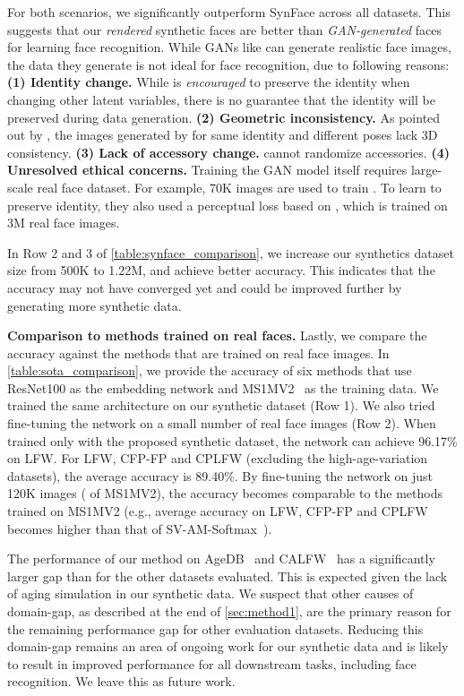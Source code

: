 \documentclass[10pt,twocolumn,letterpaper]{article}
\begin{document}
For both scenarios, we significantly outperform SynFace across all datasets.
This suggests that our \textit{rendered} synthetic faces are better than \textit{GAN-generated} faces for learning face recognition. 
While GANs like \cite{2020_discofacegan} can generate realistic face images, the data they generate is not ideal for face recognition, due to following reasons: \textbf{(1) Identity change.}
While \cite{2020_discofacegan} is \textit{encouraged} to preserve the identity when changing other latent variables, there is no guarantee that the identity will be preserved during data generation.
\textbf{(2) Geometric inconsistency.}
As pointed out by \cite{2022_gram}, the images generated by \cite{2020_discofacegan} for same identity and different poses lack 3D consistency. 
\textbf{(3) Lack of accessory change.} 
\cite{2020_discofacegan} cannot randomize accessories. 
\textbf{(4) Unresolved ethical concerns.}
Training the GAN model itself requires large-scale real face dataset.
For example, 70K images are used to train \cite{2020_discofacegan}. 
To learn to preserve identity, they also used a perceptual loss based on \cite{2017_discofacegan_perceptual}, which is trained on 3M real face images. 

In Row 2 and 3 of \autoref{table:synface_comparison}, we increase our synthetics dataset size from 500K to 1.22M, and achieve better accuracy. 
This indicates that the accuracy may not have converged yet and could be improved further by generating more synthetic data.

\noindent
\textbf{Comparison to methods trained on real faces.} 
Lastly, we compare the accuracy against the methods that are trained on real face images.
In \autoref{table:sota_comparison}, we provide the accuracy of six methods that use ResNet100 as the embedding network and MS1MV2~\cite{2019_FR_ArcFace} as the training data. 
We trained the same architecture on our synthetic dataset (Row 1). 
We also tried fine-tuning the network on a small number of real face images (Row 2). 
When trained only with the proposed synthetic dataset, the network can achieve 96.17\% on LFW. For LFW, CFP-FP and CPLFW (excluding the high-age-variation datasets), the average accuracy is 89.40\%. 
By fine-tuning the network on just 120K images ( of MS1MV2), the accuracy becomes comparable to the methods trained on MS1MV2 (e.g., average accuracy on LFW, CFP-FP and CPLFW becomes higher than that of SV-AM-Softmax~\cite{2018_FR_SV-AM-Softmax}).


The performance of our method on AgeDB~\cite{2017_FRD_AGEDB} and CALFW~\cite{2017_FRD_CALFW} has a significantly larger gap than for the other datasets evaluated.
This is expected given the lack of aging simulation in our synthetic data.
We suspect that other causes of domain-gap, as described at the end of \autoref{sec:method1}, are the primary reason for the remaining performance gap for other evaluation datasets.
Reducing this domain-gap remains an area of ongoing work for our synthetic data and is likely to result in improved performance for all downstream tasks, including face recognition. We leave this as future work.
\end{document}
